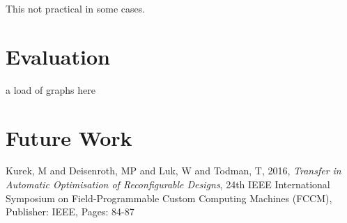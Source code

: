 \documentclass[10pt,a4paper]{article}
\begin{document}
This not practical in some cases.

\section*{Evaluation}
a load of graphs here
\section*{Future Work}

\begin{thebibliography}{9}
Kurek, M and Deisenroth, MP and Luk, W and Todman, T,
2016,
\textit{Transfer in Automatic Optimisation of Reconfigurable Designs},
24th IEEE International Symposium on Field-Programmable Custom Computing Machines (FCCM), Publisher: IEEE, Pages: 84-87

\end{thebibliography}
\end{document}
